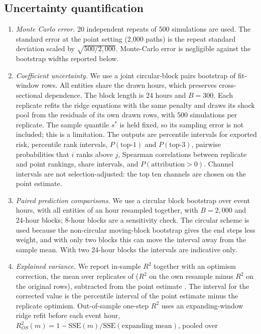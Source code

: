 \documentclass[referee,pdflatex,sn-mathphys-ay]{sn-jnl}
\theoremstyle{thmstyleone}%
\theoremstyle{thmstyletwo}%
\theoremstyle{thmstylethree}%
\begin{document}
\subsection{Uncertainty quantification}
\label{subsec:uncertainty}
\begin{enumerate}[label=(\alph*),leftmargin=*]
\item \emph{Monte Carlo error.} 20 independent repeats of 500 simulations are used.
The standard error at the point setting (2{,}000 paths) is the repeat standard deviation scaled by
$\sqrt{500/2{,}000}$. Monte-Carlo error is negligible against the bootstrap widths reported below.
\item \emph{Coefficient uncertainty.} We use a joint circular-block pairs bootstrap of fit-window rows.
All entities share the drawn hours, which preserves cross-sectional dependence. The block length is
24 hours and $B=300$. Each replicate refits the ridge equations with the same penalty
and draws its shock pool from the residuals of its own drawn rows, with 500 simulations per
replicate. The sample quantile $s^\ast$ is held fixed, so its sampling error is not included; this is a
limitation. The outputs are percentile intervals for exported risk, percentile rank intervals,
$P(\text{top-1})$ and $P(\text{top-3})$, pairwise probabilities that $i$ ranks above $j$, Spearman
correlations between replicate and point rankings, share intervals, and $P(\text{attribution}>0)$.
Channel intervals are not selection-adjusted: the top ten channels are chosen on the point estimate.
\item \emph{Paired prediction comparisons.} We use a circular block bootstrap over event hours, with all
entities of an hour resampled together, with $B=2{,}000$ and 24-hour blocks; 8-hour
blocks are a sensitivity check. The circular scheme is used because the non-circular moving-block
bootstrap \citep{kunsch1989jackknife} gives the end steps less weight, and with only two blocks this can
move the interval away from the sample mean. With two 24-hour blocks the intervals are indicative only.
\item \emph{Explained variance.} We report in-sample $R^2$ together with an optimism correction, the mean
over replicates of ($R^2$ on the own resample minus $R^2$ on the original rows), subtracted from the point
estimate \citep{efron1983estimating}. The interval for the corrected value is the percentile interval of the point estimate minus the
replicate optimism. Out-of-sample one-step $R^2$ uses an expanding-window ridge refit
before each event hour, $R^2_{OS}(m)=1-\mathrm{SSE}(m)/\mathrm{SSE}(\text{expanding mean})$, pooled over

\end{enumerate}
\end{document}
